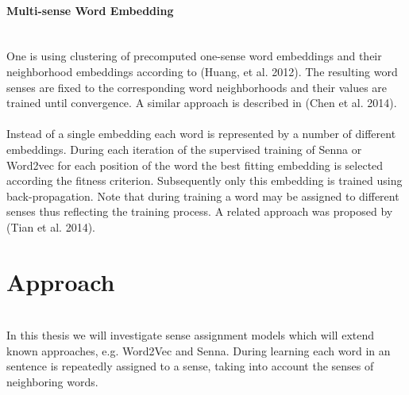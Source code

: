 \documentclass{scrartcl}
\begin{document}
\paragraph{Multi-sense Word Embedding}
\hfill \\
One is using clustering of precomputed one-sense word embeddings and their neighborhood embeddings according to (Huang, et al. 2012). The resulting word senses are fixed to the corresponding word neighborhoods and their values are trained until convergence. A similar approach is described in (Chen et al. 2014).\\
\\
Instead of a single embedding each word is represented by a number of different embeddings. During each iteration of the supervised training of Senna or Word2vec for each position of the word the best fitting embedding is selected according the fitness criterion. Subsequently only this embedding is trained using back-propagation. Note that during training a word may be assigned to different senses thus reflecting the training process. A related approach was proposed by (Tian et al. 2014).\\


\section{Approach}
\hfill \\
In this thesis we will investigate sense assignment models which will extend known approaches, e.g. Word2Vec and Senna. During learning each word in an sentence is repeatedly assigned to a sense, taking into account the senses of neighboring words.
\end{document}
